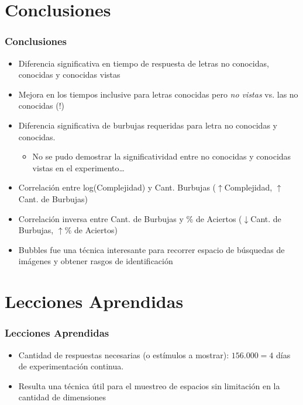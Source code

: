 \documentclass[10pt]{beamer}
\begin{document}
  \section{Conclusiones}
	\begin{frame}
	\frametitle{Conclusiones}
	    \begin{itemize}
		\item Diferencia significativa en tiempo de respuesta de letras no conocidas, conocidas y conocidas vistas
		\item Mejora en los tiempos inclusive para letras conocidas pero \emph{no vistas} vs. las no conocidas \alert{(!)}
		\item Diferencia significativa de burbujas requeridas para letra no conocidas y conocidas.
		\begin{itemize}
		    \item No se pudo demostrar la significatividad entre no conocidas y conocidas vistas en el experimento\ldots
		\end{itemize}
		\item Correlación entre log(Complejidad) y Cant. Burbujas (\alert{\bf$\uparrow$}Complejidad, \alert{\bf$\uparrow$}Cant. de Burbujas)
		\item Correlación inversa entre Cant. de Burbujas y \% de Aciertos (\alert{\bf$\downarrow$}Cant. de Burbujas, \alert{\bf$\uparrow$}\% de Aciertos)
		\item Bubbles fue una técnica interesante para recorrer espacio de búsquedas de imágenes y obtener rasgos de identificación
	    \end{itemize}
	\end{frame}

  \section{Lecciones Aprendidas}
	\begin{frame}
	\frametitle{Lecciones Aprendidas}
	    \begin{itemize}
	    \item Cantidad de respuestas necesarias (o estímulos a mostrar): $156.000 = 4$ días de experimentación continua.
	    \item Resulta una técnica útil para el muestreo de espacios sin limitación en la cantidad de dimensiones
	    \end{itemize}
	\end{frame}
\end{document}
